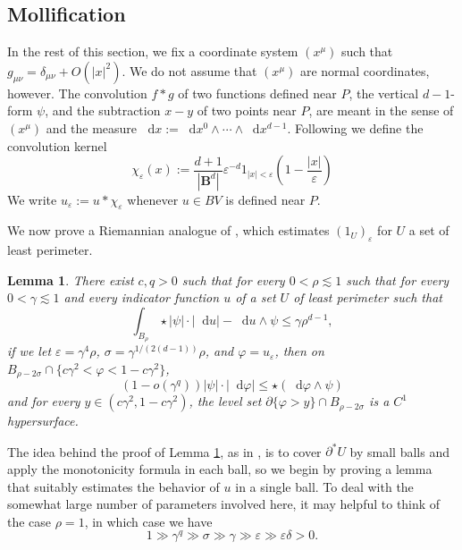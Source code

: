 \documentclass[reqno,10pt]{amsart}
\newcommand{\Ball}{\mathbf{B}}
\newcommand*\dif{\mathop{}\!\mathrm{d}}
\newtheorem{lemma}[theorem]{Lemma}
\theoremstyle{definition}
\numberwithin{equation}{section}
\begin{document}
\subsection{Mollification}

In the rest of this section, we fix a coordinate system $(x^\mu)$ such that $g_{\mu\nu} = \delta_{\mu\nu} + O(|x|^2)$.
We do not assume that $(x^\mu)$ are normal coordinates, however.
The convolution $f * g$ of two functions defined near $P$, the vertical $d-1$-form $\psi$, and the subtraction $x - y$ of two points near $P$, are meant in the sense of $(x^\mu)$ and the measure $\dif x := \dif x^0 \wedge \cdots \wedge \dif x^{d - 1}$.
Following \cite[Chapter 7]{Giusti77} we define the convolution kernel
$$\chi_\varepsilon(x) := \frac{d + 1}{|\Ball^d|} \varepsilon^{-d}1_{|x| < \varepsilon} \left(1 - \frac{|x|}{\varepsilon}\right)$$
We write $u_\varepsilon := u * \chi_\varepsilon$ whenever $u \in BV$ is defined near $P$.

We now prove a Riemannian analogue of \cite[Theorem 7.3]{Giusti77}, which estimates $(1_U)_\varepsilon$ for $U$ a set of least perimeter.

\begin{lemma}\label{main mollifier lemma}
There exist $c, q > 0$ such that for every $0 < \rho \lesssim 1$ such that for every $0 < \gamma \lesssim 1$ and every indicator function $u$ of a set $U$ of least perimeter such that
\begin{equation}\label{hypothesis on main mollifier lemma}
\int_{B_\rho} \star |\psi| \cdot |\dif u| - \dif u \wedge \psi \leq \gamma \rho^{d - 1},
\end{equation}
if we let $\varepsilon = \gamma^4\rho$, $\sigma = \gamma^{1/(2(d - 1))}\rho$, and $\varphi = u_\varepsilon$, then on $B_{\rho - 2\sigma} \cap \{c\gamma^2 < \varphi < 1 - c\gamma^2\}$,
\begin{equation}\label{claim on main mollifier lemma}
(1 - o(\gamma^q)) |\psi| \cdot |\dif \varphi| \leq \star(\dif \varphi \wedge \psi)
\end{equation}
and for every $y \in (c\gamma^2, 1 - c\gamma^2)$, the level set $\partial \{\varphi > y\} \cap B_{\rho - 2\sigma}$ is a $C^1$ hypersurface.
\end{lemma}

The idea behind the proof of Lemma \ref{main mollifier lemma}, as in \cite{Giusti77}, is to cover $\partial^* U$ by small balls and apply the monotonicity formula in each ball, so we begin by proving a lemma that suitably estimates the behavior of $u$ in a single ball.
To deal with the somewhat large number of parameters involved here, it may helpful to think of the case $\rho = 1$, in which case we have
$$1 \gg \gamma^q \gg \sigma \gg \gamma \gg \varepsilon \gg \varepsilon \delta > 0.$$
\end{document}
